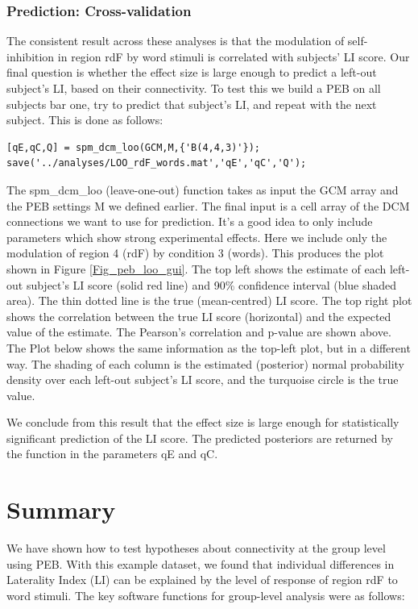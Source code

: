 \documentclass{article}
\begin{document}
\subsubsection{Prediction: Cross-validation}
The consistent result across these analyses is that the modulation of self-inhibition in region rdF by word stimuli is correlated with subjects' LI score. Our final question is whether the effect size is large enough to predict a left-out subject's LI, based on their connectivity. To test this we build a PEB on all subjects bar one, try to predict that subject's LI, and repeat with the next subject. This is done as follows:

\begin{lstlisting}[style=Matlab-editor,caption=Cross-validation]
[qE,qC,Q] = spm_dcm_loo(GCM,M,{'B(4,4,3)'});
save('../analyses/LOO_rdF_words.mat','qE','qC','Q');
\end{lstlisting}

The spm\_dcm\_loo (leave-one-out) function takes as input the GCM array and the PEB settings M we defined earlier. The final input is a cell array of the DCM connections we want to use for prediction. It's a good idea to only include parameters which show strong experimental effects. Here we include only the modulation of region 4 (rdF) by condition 3 (words). This produces the plot shown in Figure \ref{Fig_peb_loo_gui}. The top left shows the estimate of each left-out subject's LI score (solid red line) and 90\% confidence interval (blue shaded area). The thin dotted line is the true (mean-centred) LI score. The top right plot shows the correlation between the true LI score (horizontal) and the expected value of the estimate. The Pearson's correlation and p-value are shown above. The Plot below shows the same information as the top-left plot, but in a different way. The shading of each column is the estimated (posterior) normal probability density over each left-out subject's LI score, and the turquoise circle is the true value. 

We conclude from this result that the effect size is large enough for statistically significant prediction of the LI score. The predicted posteriors are returned by the function in the parameters qE and qC.

\section{Summary}

We have shown how to test hypotheses about connectivity at the group level using PEB. With this example dataset, we found that individual differences in Laterality Index (LI) can be explained by the level of response of region rdF to word stimuli. The key software functions for group-level analysis were as follows:
\end{document}
